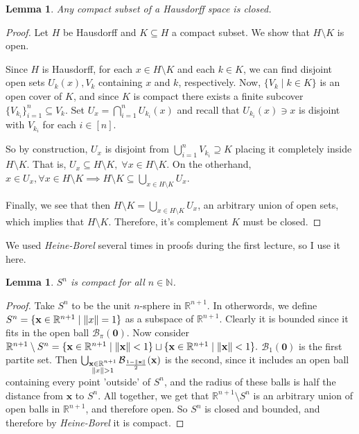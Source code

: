 \documentclass[addpoints,10pt]{exam}
\theoremstyle{plain}
\theoremstyle{definition}
\theoremstyle{plain}
\theoremstyle{plain}
\newtheorem{lem}[thm]{Lemma}
\theoremstyle{definition}
\newcommand{\NN}{\ensuremath{\mathbb{N}}}
\newcommand{\RR}{\ensuremath{\mathbb{R}}}
\newcommand{\BB}{\ensuremath{\mathcal{B}}}
\DeclarePairedDelimiter{\norm}{\lVert}{\rVert} %
\newcommand{\mbf}[1]{\ensuremath{\mathbf{#1}}}
\begin{document}
\begin{lem}\label{lem:comhausclosed}
  Any compact subset of a Hausdorff space is closed.
\end{lem}
  \begin{proof}
    Let $H$ be Hausdorff and $K\subseteq H$ a compact subset. We show that $H\setminus K$ is open. 

    Since $H$ is Hausdorff, for each $x\in H\setminus K$ and each $k\in K$, we can find disjoint open sets $U_{k}(x),V_{k}$ containing $x$ and $k$, respectively. Now, $\{V_{k}\mid k\in K\}$ is an open cover of $K$, and since $K$ is compact there exists a finite subcover $\{V_{k_{i}}\}_{i=1}^{n}\subseteq {V_{k}}$. Set $U_{x}=\bigcap_{i=1}^{n}U_{k_{i}}(x)$ and recall that $U_{k_{i}}(x)\ni x$ is disjoint with $V_{k_{i}}$ for each $i\in [n]$. 
    
    So by construction, $U_{x}$ is disjoint from $\bigcup_{i=1}^{n} V_{k_{i}}\supseteq K$ placing it completely inside $H\setminus K.$ That is, $U_{x}\subseteq H\setminus K,\;\forall x\in H\setminus K$. On the otherhand, $x\in U_{x},\forall x\in H\setminus K\implies H\setminus K\subseteq \bigcup_{x\in H\setminus K}U_{x}.$

    Finally, we see that then $H\setminus K=\bigcup_{x\in H\setminus K} U_{x}$, an arbitrary union of open sets, which implies that $H\setminus K$. Therefore, it's complement $K$ must be closed.

  \end{proof}
\newpage
  We used \textit{Heine-Borel} several times in proofs during the first lecture, so I use it here.

  \begin{lem}\label{lem:Scompact} $S^n$ is compact for all $n\in \NN$.
  \end{lem}
    \begin{proof}
      Take $S^{n}$ to be the unit $n$-sphere in $\RR^{n+1}.$ In otherwords, we define $S^{n}=\{\mbf{x}\in \RR^{n+1}\mid \norm{x}=1\}$ as a subspace of $\RR^{n+1}.$ Clearly it is bounded since it fits in the open ball $\BB_{\pi}(\mbf{0})$. Now consider $\RR^{n+1}\setminus S^{n}=\{\mbf{x}\in \RR^{n+1}\mid \norm{\mbf{x}}<1\}\sqcup \{\mbf{x}\in \RR^{n+1}\mid \norm{\mbf{x}}<1\}.$ $\BB_{1}(\mbf{0})$ is the first partite set. Then $\bigcup_{\substack{\mbf{x}\in \RR^{n+1} \\ \norm{x}>1}}\BB_{\frac{1-\norm{\mbf{x}}}{2}}(\mbf{x})$ is the second, since it includes an open ball containing every point 'outside' of $S^{n}$, and the radius of these balls is half the distance from $\mbf{x}$ to $S^{n}$. All together, we get that $\RR^{n+1}\setminus S^{n}$ is an arbitrary union  of open balls in $\RR^{n+1}$, and therefore open. So $S^{n}$ is closed and bounded, and therefore by \textit{Heine-Borel} it is compact.
    \end{proof}
\end{document}

